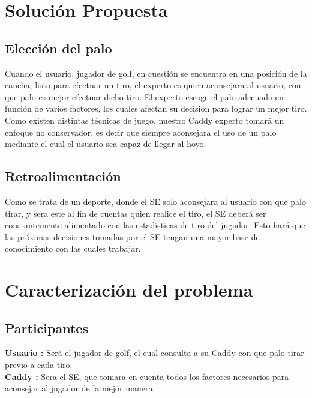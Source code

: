 \documentclass[runningheads,a4paper]{llncs}
\begin{document}
\section{Solución Propuesta}
\subsection{Elección del palo}
Cuando el usuario, jugador de golf, en cuestión se encuentra en una posición de la cancha, listo para efectuar un tiro, el experto es quien aconsejara al usuario, con que palo es mejor efectuar dicho tiro. El experto escoge el palo adecuado en función de varios factores, los cuales afectan su decisión para lograr un mejor tiro.\\
	Como existen distintas técnicas de juego, nuestro Caddy experto tomará un enfoque no conservador, es decir que siempre aconsejara el uso de un palo mediante el cual el usuario sea capaz de llegar al hoyo.
	
\subsection{Retroalimentación}
Como se trata de un deporte, donde el SE solo aconsejara al usuario con que palo tirar, y sera este al fin de cuentas quien realice el tiro, el SE deberá ser constantemente alimentado con las estadísticas de tiro del jugador. Esto hará que las próximas decisiones tomadas por el SE tengan una mayor base de conocimiento con las cuales trabajar.\\
 
\section{Caracterización del problema}
\subsection{Participantes}
\textbf{Usuario :} Será el jugador de golf, el cual consulta a su Caddy con que palo tirar previo a cada tiro.\\
\textbf{Caddy :} Sera el SE, que tomara en cuenta todos los factores necesarios para aconsejar al jugador de la mejor manera.\\
\end{document}
